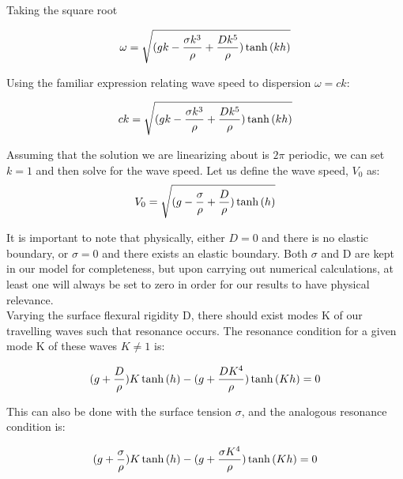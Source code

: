 \documentclass{article}
\begin{document}
Taking the square root

\vspace{10}

\begin{equation} \label{dispersion}
 \omega = \sqrt{(gk - \frac{\sigma k^3}{\rho} + \frac{D k^5}{\rho})\tanh{(kh)}}  
 \\
\end{equation}

Using the familiar expression relating wave speed to dispersion \(\omega = ck\):

\begin{equation} \label{V}
 ck = \sqrt{(gk - \frac{\sigma k^3}{\rho} + \frac{D k^5}{\rho})\tanh{(kh)}}
 \\
\end{equation}

Assuming that the solution we are linearizing about is \(2 \pi\) periodic, we can set \(k = 1\) and then solve for the wave speed. Let us define the wave speed, \(V_{0}\) as:\\

\begin{equation} \label{V}
 V_{0} = \sqrt{(g - \frac{\sigma }{\rho} + \frac{D }{\rho})\tanh{(h)}}  
 \\
\end{equation}

It is important to note that physically, either \(D = 0\) and there is no elastic boundary, or \(\sigma = 0\) and there exists an elastic boundary. Both \(\sigma\) and D are kept in our model for completeness, but upon carrying out numerical calculations, at least one will always be set to zero in order for our results to have physical relevance.\\

Varying the surface flexural rigidity D, there should exist modes K of our travelling waves such that  resonance occurs. The resonance condition for a given mode K of these waves \(K \neq 1\) is:

\begin{equation} \label{resonance}
(g + \frac{D}{\rho})K\tanh{(h)} - (g + \frac{DK^4}{\rho})\tanh{(Kh)} = 0 
 \\
\end{equation}

This can also be done with the surface tension \(\sigma\), and the analogous resonance condition is:

\begin{equation} \label{resonancesigma}
(g + \frac{\sigma}{\rho})K\tanh{(h)} - (g + \frac{\sigma K^4}{\rho})\tanh{(Kh)} = 0 
 \\
\end{equation}
\end{document}
